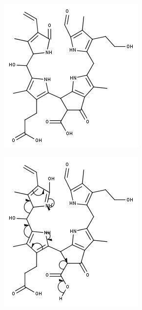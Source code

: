 \begin{figure}[!htbp]
  \begin{subfigure}[b]{0.5\textwidth}
    \includegraphics[width=\textwidth]{figures/Kapitel7/Kataboliten/fragmentation_structures/VWA_Katabolit_647.png}
    \caption{}
    \label{fig:NCC2725}
  \end{subfigure}
  \hfill
  \begin{subfigure}[b]{0.5\textwidth}
    \includegraphics[width=\textwidth]{figures/Kapitel7/Kataboliten/fragmentation_structures/VWA_Katabolit_647-CO2-RingD_480_MH_electronMovement.png}

\end{subfigure}
\end{figure}
